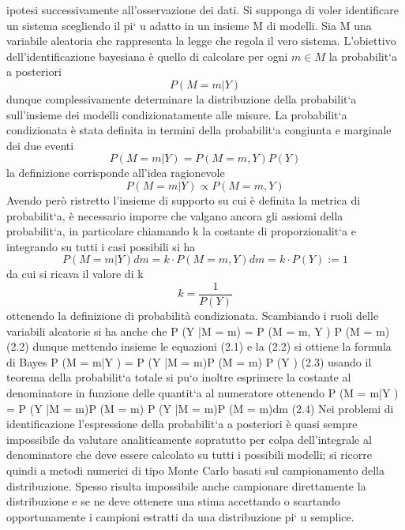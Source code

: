 \documentclass[10pt,a4paper,oneside,openany]{book}
\begin{document}
ipotesi successivamente all’osservazione dei dati. Si supponga di voler identificare
un sistema scegliendo il pi`
u adatto in un insieme M di modelli.
Sia M una variabile aleatoria che rappresenta la legge che regola il vero sistema.
L’obiettivo dell’identificazione bayesiana è quello di calcolare per ogni $m\in M$ la
probabilit`a a posteriori
\[P (M = m|Y )\]
dunque complessivamente determinare la distribuzione della probabilit`a sull’insieme
dei modelli condizionatamente alle misure.
La probabilit`a condizionata è stata definita in termini della probabilit`a congiunta e
marginale dei due eventi
\[P (M = m|Y ) =
P (M = m, Y )
P (Y )\]
la definizione corrisponde all’idea ragionevole
\[P (M = m|Y ) \propto P (M = m, Y )\]
Avendo però ristretto l’insieme di supporto su cui è definita la metrica di probabilit`a,
è necessario imporre che valgano ancora gli assiomi della probabilit`a, in particolare
chiamando k la costante di proporzionalit`a e integrando su tutti i casi possibili si ha
\[P (M = m|Y )dm =
k \cdot P (M = m, Y )dm = k \cdot P (Y ) := 1\]
da cui si ricava il valore di k
\[k =
\frac{1}{P(Y)}\]
ottenendo la definizione di probabilità condizionata.
Scambiando i ruoli delle variabili aleatorie si ha anche che
P (Y |M = m) =
P (M = m, Y )
P (M = m)
(2.2)
dunque mettendo insieme le equazioni (2.1) e la (2.2) si ottiene la formula di Bayes
P (M = m|Y ) =
P (Y |M = m)P (M = m)
P (Y )
(2.3)
usando il teorema della probabilit`a totale si pu`o inoltre esprimere la costante al
denominatore in funzione delle quantit`a al numeratore ottenendo
P (M = m|Y ) =
P (Y |M = m)P (M = m)
P (Y |M = m)P (M = m)dm
(2.4)
Nei problemi di identificazione l’espressione della probabilit`a a posteriori è quasi
sempre impossibile da valutare analiticamente sopratutto per colpa dell’integrale al
denominatore che deve essere calcolato su tutti i possibili modelli; si ricorre quindi a
metodi numerici di tipo Monte Carlo basati sul campionamento della distribuzione.
Spesso risulta impossibile anche campionare direttamente la distribuzione e se ne
deve ottenere una stima accettando o scartando opportunamente i campioni estratti
da una distribuzione pi`
u semplice.
\end{document}
